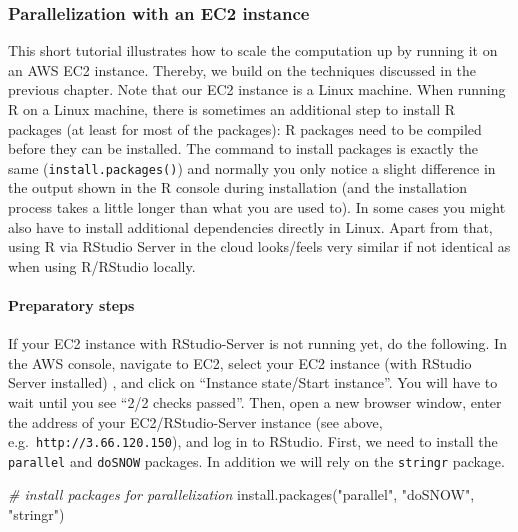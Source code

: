 \documentclass[
  12pt,
]{style/krantz}
\newenvironment{Shaded}{\begin{snugshade}}{\end{snugshade}}
\newcommand{\CommentTok}[1]{\textcolor[rgb]{0.56,0.35,0.01}{\textit{#1}}}
\newcommand{\FunctionTok}[1]{\textcolor[rgb]{0.00,0.00,0.00}{#1}}
\newcommand{\NormalTok}[1]{#1}
\newcommand{\StringTok}[1]{\textcolor[rgb]{0.31,0.60,0.02}{#1}}
\begin{document}
\hypertarget{parallelization-with-an-ec2-instance}{%
\subsubsection{Parallelization with an EC2 instance}\label{parallelization-with-an-ec2-instance}}

This short tutorial illustrates how to scale the computation up by running it on an AWS EC2 instance. Thereby, we build on the techniques discussed in the previous chapter. Note that our EC2 instance is a Linux machine. When running R on a Linux machine, there is sometimes an additional step to install R packages (at least for most of the packages): R packages need to be compiled before they can be installed. The command to install packages is exactly the same (\texttt{install.packages()}) and normally you only notice a slight difference in the output shown in the R console during installation (and the installation process takes a little longer than what you are used to). In some cases you might also have to install additional dependencies directly in Linux. Apart from that, using R via RStudio Server in the cloud looks/feels very similar if not identical as when using R/RStudio locally.

\hypertarget{preparatory-steps}{%
\paragraph{Preparatory steps}\label{preparatory-steps}}

If your EC2 instance with RStudio-Server is not running yet, do the following. In the AWS console, navigate to EC2, select your EC2 instance (with RStudio Server installed) , and click on ``Instance state/Start instance''. You will have to wait until you see ``2/2 checks passed''. Then, open a new browser window, enter the address of your EC2/RStudio-Server instance (see above, e.g.~\texttt{http://3.66.120.150}), and log in to RStudio. First, we need to install the \texttt{parallel} and \texttt{doSNOW} packages. In addition we will rely on the \texttt{stringr} package.

\begin{Shaded}
\begin{Highlighting}[]
\CommentTok{\# install packages for parallelization}
\FunctionTok{install.packages}\NormalTok{(}\StringTok{"parallel"}\NormalTok{, }\StringTok{"doSNOW"}\NormalTok{, }\StringTok{"stringr"}\NormalTok{)}
\end{Highlighting}
\end{Shaded}
\end{document}
